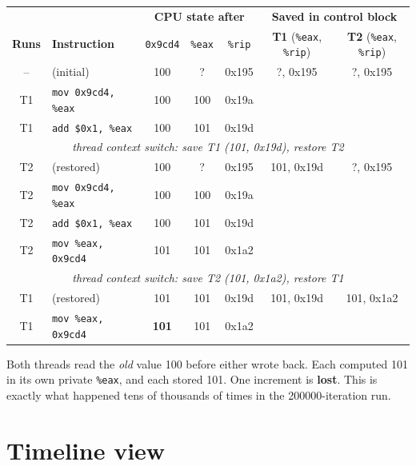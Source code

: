 \documentclass[11pt,a4paper]{article}
\newcommand{\eax}{\texttt{\%eax}}
\newcommand{\rip}{\texttt{\%rip}}
\begin{document}
\begin{center}
\renewcommand{\arraystretch}{1.1}
\setlength{\tabcolsep}{5pt}
\begin{tabular}{@{}clccc|cc@{}}
  \toprule
  & & \multicolumn{3}{c|}{\textbf{CPU state after}} & \multicolumn{2}{c}{\textbf{Saved in control block}} \\
  \textbf{Runs} & \textbf{Instruction} & \texttt{0x9cd4} & \eax & \rip & \textbf{T1} (\eax, \rip) & \textbf{T2} (\eax, \rip) \\
  \midrule
  --  & (initial)                   & 100 & ?   & 0x195 & ?, 0x195   & ?, 0x195 \\
  T1  & \texttt{mov 0x9cd4, \%eax}  & 100 & 100 & 0x19a & & \\
  T1  & \texttt{add \$0x1, \%eax}   & 100 & 101 & 0x19d & & \\
  \midrule
  \multicolumn{7}{c}{\textit{thread context switch: save T1 (101, 0x19d), restore T2}} \\
  \midrule
  T2  & (restored)                  & 100 & ?   & 0x195 & 101, 0x19d & ?, 0x195 \\
  T2  & \texttt{mov 0x9cd4, \%eax}  & 100 & 100 & 0x19a & & \\
  T2  & \texttt{add \$0x1, \%eax}   & 100 & 101 & 0x19d & & \\
  T2  & \texttt{mov \%eax, 0x9cd4}  & 101 & 101 & 0x1a2 & & \\
  \midrule
  \multicolumn{7}{c}{\textit{thread context switch: save T2 (101, 0x1a2), restore T1}} \\
  \midrule
  T1  & (restored)                  & 101 & 101 & 0x19d & 101, 0x19d & 101, 0x1a2 \\
  T1  & \texttt{mov \%eax, 0x9cd4}  & \textbf{101} & 101 & 0x1a2 & & \\
  \bottomrule
\end{tabular}
\end{center}

\begin{warnbox}
Both threads read the \emph{old} value 100 before either wrote back. Each
computed 101 in its own private \eax, and each stored 101. One increment
is \textbf{lost}. This is exactly what happened tens of thousands of times
in the 200000-iteration run.
\end{warnbox}

\newpage
\section{Timeline view}
\end{document}
